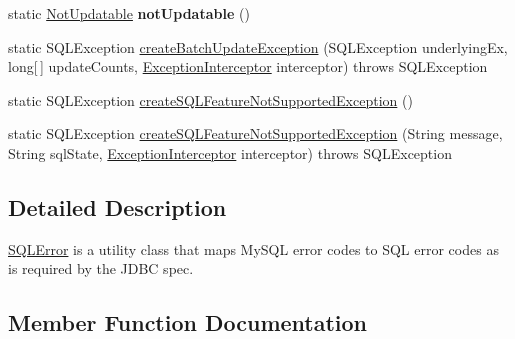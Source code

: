 \begin{DoxyCompactItemize}
\item 
\mbox{\label{classcom_1_1mysql_1_1cj_1_1jdbc_1_1exceptions_1_1_s_q_l_error_a29c9a6726ffb8e42e79692693a605a01}} 
static \mbox{\hyperlink{classcom_1_1mysql_1_1cj_1_1jdbc_1_1exceptions_1_1_not_updatable}{Not\+Updatable}} {\bfseries not\+Updatable} ()
\item 
static S\+Q\+L\+Exception \mbox{\hyperlink{classcom_1_1mysql_1_1cj_1_1jdbc_1_1exceptions_1_1_s_q_l_error_ad5fbaafacc50a60f52cff3a129d1c9a8}{create\+Batch\+Update\+Exception}} (S\+Q\+L\+Exception underlying\+Ex, long\mbox{[}$\,$\mbox{]} update\+Counts, \mbox{\hyperlink{interfacecom_1_1mysql_1_1cj_1_1exceptions_1_1_exception_interceptor}{Exception\+Interceptor}} interceptor)  throws S\+Q\+L\+Exception 
\item 
static S\+Q\+L\+Exception \mbox{\hyperlink{classcom_1_1mysql_1_1cj_1_1jdbc_1_1exceptions_1_1_s_q_l_error_a2ad9561685f7235ef3ff3d52220f5e44}{create\+S\+Q\+L\+Feature\+Not\+Supported\+Exception}} ()
\item 
static S\+Q\+L\+Exception \mbox{\hyperlink{classcom_1_1mysql_1_1cj_1_1jdbc_1_1exceptions_1_1_s_q_l_error_ab839381274c7a56aafc61f84cb39373f}{create\+S\+Q\+L\+Feature\+Not\+Supported\+Exception}} (String message, String sql\+State, \mbox{\hyperlink{interfacecom_1_1mysql_1_1cj_1_1exceptions_1_1_exception_interceptor}{Exception\+Interceptor}} interceptor)  throws S\+Q\+L\+Exception 
\end{DoxyCompactItemize}


\subsection{Detailed Description}
\mbox{\hyperlink{classcom_1_1mysql_1_1cj_1_1jdbc_1_1exceptions_1_1_s_q_l_error}{S\+Q\+L\+Error}} is a utility class that maps My\+S\+QL error codes to S\+QL error codes as is required by the J\+D\+BC spec. 

\subsection{Member Function Documentation}
\mbox{\label{classcom_1_1mysql_1_1cj_1_1jdbc_1_1exceptions_1_1_s_q_l_error_ad5fbaafacc50a60f52cff3a129d1c9a8}} 
